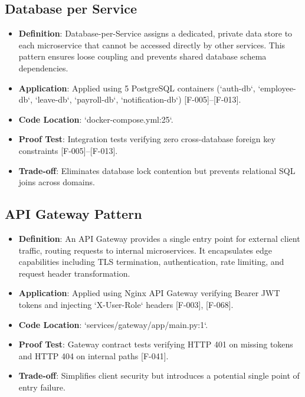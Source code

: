 \documentclass[11pt,a4paper]{article}
\begin{document}
\subsection{Database per Service}
\begin{itemize}
    \item \textbf{Definition}: Database-per-Service assigns a dedicated, private data store to each microservice that cannot be accessed directly by other services. This pattern ensures loose coupling and prevents shared database schema dependencies.
    \item \textbf{Application}: Applied using 5 PostgreSQL containers (`auth-db`, `employee-db`, `leave-db`, `payroll-db`, `notification-db`) [F-005]--[F-013].
    \item \textbf{Code Location}: `docker-compose.yml:25`.
    \item \textbf{Proof Test}: Integration tests verifying zero cross-database foreign key constraints [F-005]--[F-013].
    \item \textbf{Trade-off}: Eliminates database lock contention but prevents relational SQL joins across domains.
\end{itemize}

\subsection{API Gateway Pattern}
\begin{itemize}
    \item \textbf{Definition}: An API Gateway provides a single entry point for external client traffic, routing requests to internal microservices. It encapsulates edge capabilities including TLS termination, authentication, rate limiting, and request header transformation.
    \item \textbf{Application}: Applied using Nginx API Gateway verifying Bearer JWT tokens and injecting `X-User-Role` headers [F-003], [F-068].
    \item \textbf{Code Location}: `services/gateway/app/main.py:1`.
    \item \textbf{Proof Test}: Gateway contract tests verifying HTTP 401 on missing tokens and HTTP 404 on internal paths [F-041].
    \item \textbf{Trade-off}: Simplifies client security but introduces a potential single point of entry failure.
\end{itemize}
\end{document}
